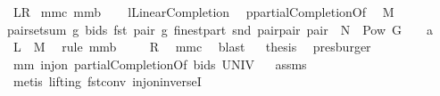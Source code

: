 \begin{isabellebody}
{\isacharparenleft}\ {\isachardoublequoteopen}{\isacharquery}L{\isacharequal}{\isacharquery}R{\isachardoublequoteclose}{\isacharparenright}\isanewline
%
\isadelimproof
%
\endisadelimproof
%
\isatagproof
{}\isamarkupfalse%
\ mm{}{}c\ mm{}{}b\ \isanewline
{}\isamarkupfalse%
\ {\isacharminus}\isanewline
{}\isamarkupfalse%
\ {\isacharquery}l{\isacharequal}LinearCompletion\ \isamarkupfalse%
\ {\isacharquery}p{\isacharequal}partialCompletionOf\ \isamarkupfalse%
\ {\isacharquery}M{\isacharequal}{\isachardoublequoteopen}{\isacharbraceleft}\isanewline
{\isacharparenleft}pair{\isacharcomma}setsum\ {\isacharparenleft}{\isacharpercent}g{\isachardot}\ bids\ {\isacharparenleft}fst\ pair{\isacharcomma}\ g{\isacharparenright}{\isacharparenright}\ {\isacharparenleft}finestpart\ {\isacharparenleft}snd\ pair{\isacharparenright}{\isacharparenright}{\isacharparenright}{\isacharbar}pair{\isachardot}\ pair\ {\isasymin}\ {\isacharparenleft}N\ {\isasymtimes}\ {\isacharparenleft}Pow\ G\ {\isacharminus}\ {\isacharbraceleft}{\isacharbraceleft}{\isacharbraceright}{\isacharbraceright}{\isacharparenright}{\isacharparenright}\ {\isasyminter}\ a{\isacharbraceright}{\isachardoublequoteclose}\isanewline
{}\isamarkupfalse%
\ {\isachardoublequoteopen}{\isacharquery}L\ {\isacharequal}\ {\isacharquery}M{\isachardoublequoteclose}\ \isamarkupfalse%
\ {\isacharparenleft}rule\ mm{}{}b{\isacharparenright}\isanewline
{}\isamarkupfalse%
\ \isamarkupfalse%
\ {\isachardoublequoteopen}{\isachardot}{\isachardot}{\isachardot}\ {\isacharequal}\ {\isacharquery}R{\isachardoublequoteclose}\ \isamarkupfalse%
\ mm{}{}c\ \isamarkupfalse%
\ blast\isanewline
{}\isamarkupfalse%
\ \isamarkupfalse%
\ {\isacharquery}thesis\ \isamarkupfalse%
\ presburger\isanewline
{}\isamarkupfalse%
%
\endisatagproof
{\isafoldproof}%
%
\isadelimproof
\isanewline
%
\endisadelimproof
{}\isamarkupfalse%
\ mm{}{}{\isacharcolon}\ {\isachardoublequoteopen}inj{\isacharunderscore}on\ {\isacharparenleft}partialCompletionOf\ bids{\isacharparenright}\ UNIV{\isachardoublequoteclose}%
\isadelimproof
\ %
\endisadelimproof
%
\isatagproof
{}\isamarkupfalse%
\ assms\ \isamarkupfalse%
\ {\isacharparenleft}metis\ {\isacharparenleft}lifting{\isacharparenright}\ fst{\isacharunderscore}conv\ inj{\isacharunderscore}on{\isacharunderscore}inverseI{\isacharparenright}%

\end{isabellebody}
